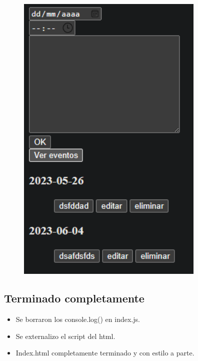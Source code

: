\documentclass{article}
\begin{document}
	\begin{figure}[H]
		\centering
		\includegraphics[width=0.8\textwidth,keepaspectratio]{img/ver-eventos01.png}
	\end{figure}
	\subsection{Terminado completamente}
	\begin{itemize}	
		\item Se borraron los console.log() en index.js.
		\item Se externalizo el script del html.
		\item Index.html completamente terminado y con estilo a parte.
	\end{itemize}
\end{document}
